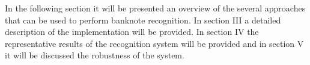 In the following section it will be presented an overview of the several approaches that can be used to perform banknote recognition. In section III a detailed description of the implementation will be provided. In section IV the representative results of the recognition system will be provided and in section V it will be discussed the robustness of the system.
